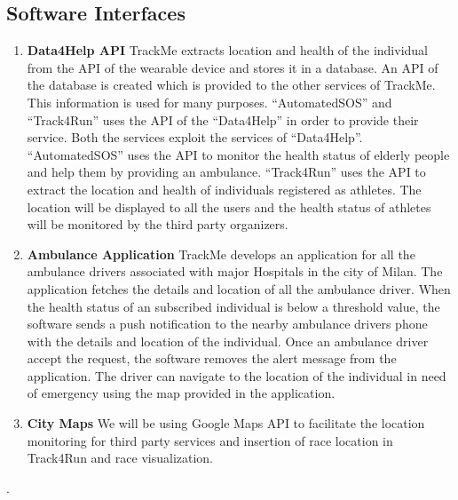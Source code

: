 \subsection{Software Interfaces}
\begin{enumerate}
\item \textbf{Data4Help API}
\newline \qquad TrackMe extracts location and health of the individual from the API of the   wearable device and stores it in a database. An API of the database is created which is provided to the other services of TrackMe. This information is used for many purposes. “AutomatedSOS” and “Track4Run” uses the API of the “Data4Help” in order to provide their service. Both the services exploit the services of “Data4Help”. “AutomatedSOS” uses the API to monitor the health status of elderly people and help them by providing an ambulance. “Track4Run” uses the API to extract the location and health of individuals registered as athletes. The location will be displayed to all the users and the health status of athletes will be monitored by the third party organizers.
\item \textbf{Ambulance Application}
\newline\qquad TrackMe develops an application for all the ambulance drivers associated with major Hospitals in the city of Milan. The application fetches the details and location of all the ambulance driver. When the health status of an subscribed individual is below a threshold value, the software sends a push notification to the nearby ambulance drivers phone with the details and location of the individual. Once an ambulance driver accept the request, the software removes the alert message from the application. The driver can navigate to the location of the individual in need of emergency using the map provided in the application.
\item \textbf{City Maps}
\newline\qquad We will be using Google Maps API to facilitate the location monitoring for third party services and insertion of race location in Track4Run and race visualization.
\end{enumerate}
.\newline\newline\newline\newline\newline\newline\newline
